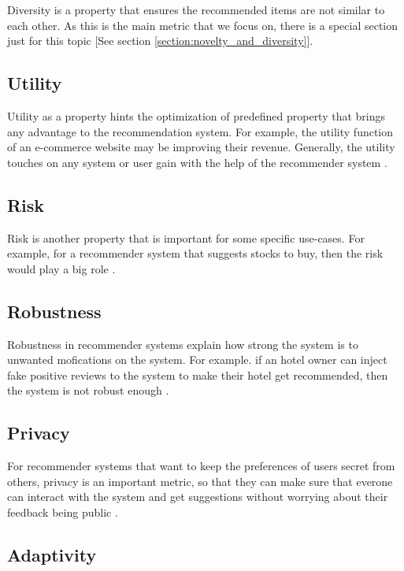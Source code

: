 Diversity is a property that ensures the recommended items are not similar to each other. As this is the main metric that we focus on, there is a special section just for this topic [See section \ref{section:novelty_and_diversity}].


\subsection{Utility}

Utility as a property hints the optimization of predefined property that brings any advantage to the recommendation system. For example, the utility function of an e-commerce website may be improving their revenue. Generally, the utility touches on any system or user gain with the help of the recommender system \cite{shani2011evaluating}.

\subsection{Risk}

Risk is another property that is important for some specific use-cases. For example, for a recommender system that suggests stocks to buy, then the risk would play a big role \cite{shani2011evaluating}.

\subsection{Robustness}

Robustness in recommender systems explain how strong the system is to unwanted mofications on the system. For example. if an hotel owner can inject fake positive reviews to the system to make their hotel get recommended, then the system is not robust enough \cite{shani2011evaluating}.

\subsection{Privacy}

For recommender systems that want to keep the preferences of users secret from others, privacy is an important metric, so that they can make sure that everone can interact with the system and get suggestions without worrying about their feedback being public \cite{shani2011evaluating}.

\subsection{Adaptivity}

